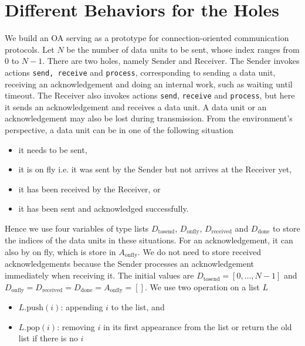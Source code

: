\section{Different Behaviors for the Holes}


We build an OA serving as a prototype for connection-oriented communication protocols. Let $N$ be the number of data units to be sent, whose index ranges from $0$ to $N-1$. There are two holes, namely Sender and Receiver. The Sender invokes actions \texttt{send, receive} and \texttt{process}, corresponding to sending a data unit, receiving an acknowledgement and doing an internal work, such as waiting until timeout. The Receiver also invokes actions \texttt{send}, \texttt{receive} and \texttt{process}, but here it sends an acknowledgement and receives a data unit. A data unit or an acknowledgement may also be lost during transmission. From the environment's perspective, a data unit can be in one of the following situation

\begin{itemize}
	\item it needs to be sent,
	\item it is on fly i.e. it was sent by the Sender but not arrives at the Receiver yet,
	\item it has been received by the Receiver, or
	\item it has been sent and acknowledged successfully.
\end{itemize}

Hence we use four variables of type lists $D_{\text{tosend}}$, $D_{\text{onfly}}$, $D_{\text{received}}$ and $D_{\text{done}}$ to store the indices of the data units in these situations. For an acknowledgement, it can also by on fly, which is store in $A_\text{onfly}$. We do not need to store received acknowledgements because the Sender  processes an acknowledgement immediately when receiving it. The initial values are $D_{\text{tosend}} = [0,\ldots, N-1]$ and $D_{\text{onfly}}=D_{\text{received}}=D_{\text{done}}=A_{\text{onfly}}=[]$. We use two operation on a list $L$

\begin{itemize}
	\item $L.\text{push}(i)$: appending $i$ to the list, and
	\item $L.\text{pop}(i)$: removing $i$ in its first appearance from the list or return the old list if there is no $i$
\end{itemize}

